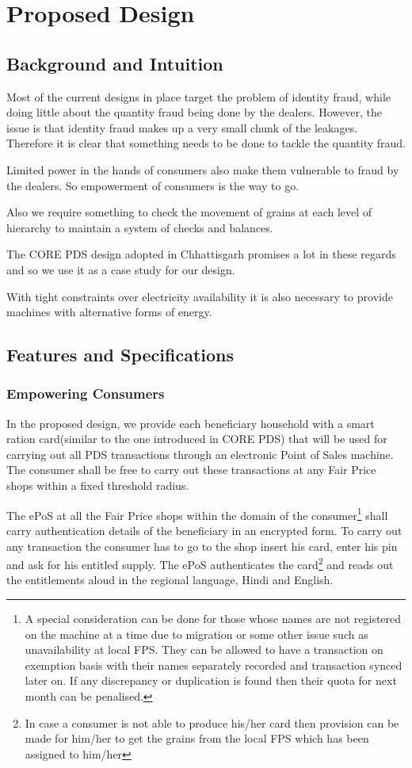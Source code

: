 \documentclass[a4paper,12pt,openany]{book}
\begin{document}
\chapter{Proposed Design}

\section{Background and Intuition}
Most of the current designs in place target the problem of identity fraud, while doing little about the quantity fraud being done by the dealers. However, the issue is that identity fraud makes up a very small chunk of the leakages. Therefore it is clear that something needs to be done to tackle the quantity fraud.

Limited power in the hands of consumers also make them vulnerable to fraud by the dealers. So empowerment of consumers is the way to go.

Also we require something to check the movement of grains at each level of hierarchy to maintain a system of checks and balances.

The CORE PDS design \cite{Design} adopted in Chhattisgarh promises a lot in these regards and so we use it as a case study for our design.

With tight constraints over electricity availability it is also necessary to provide machines with alternative forms of energy.

\section{Features and Specifications}
\subsection{Empowering Consumers}
In the proposed design, we provide each beneficiary household with a smart ration card(similar to the one introduced in CORE PDS) that will be used for carrying out all PDS transactions through an electronic Point of Sales machine. The consumer shall be free to carry out these transactions at any Fair Price shops within a fixed threshold radius. 

The ePoS at all the Fair Price shops within the domain of the consumer\footnote{A special consideration can be done for those whose names are not registered on the machine at a time due to migration or some other issue such as unavailability at local FPS. They can be allowed to have a transaction on exemption basis with their names separately recorded and transaction synced later on. If any discrepancy or duplication is found then their quota for next month can be penalised.} shall carry authentication details of the beneficiary in an encrypted form. To carry out any transaction the consumer has to go to the shop insert his card, enter his pin and ask for his entitled supply. The ePoS authenticates the card\footnote{In case a consumer is not able to produce his/her card then provision can be made for him/her to get the grains from the local FPS which has been assigned to him/her} and reads out the entitlements aloud in the regional language, Hindi and English.
\end{document}

